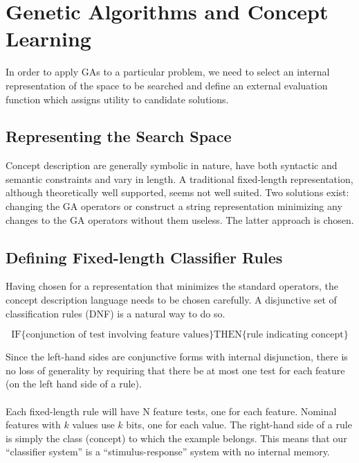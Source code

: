 \documentclass[../main.tex]{subfiles}
\begin{document}
\section{Genetic Algorithms and Concept Learning}
In order to apply GAs to a particular problem, we need to select an internal representation of the space to be searched
and define an external evaluation function which assigns utility to candidate solutions.

\subsection{Representing the Search Space}

Concept description are generally symbolic in nature, have both syntactic and semantic constraints and vary in length.
A traditional fixed-length representation, although theoretically well supported, seems not well suited. Two solutions
exist: changing the GA operators or construct a string representation minimizing any changes to the GA operators
without them useless. The latter approach is chosen.

\subsection{Defining Fixed-length Classifier Rules}

Having chosen for a representation that minimizes the standard operators, the concept description language needs to be
chosen carefully. A disjunctive set of classification rules (DNF) is a natural way to do so.

\[
\text{IF} \{ \text{conjunction of test involving feature values} \} \text{THEN} \{ \text{rule indicating concept} \}
\]

Since the left-hand sides are conjunctive forms with internal disjunction, there is no loss of generality by requiring
that there be at most one test for each feature (on the left hand side of a rule).
\\\\
Each fixed-length rule will have N feature tests, one for each feature. Nominal features with $k$ values use $k$ bits,
one for each value. The right-hand side of a rule is simply the class (concept) to which the example belongs. This
means that our ``classifier system'' is a ``stimulus-response'' system with no internal memory.
\end{document}
